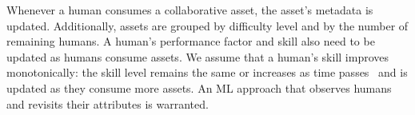 \documentclass[11pt]{article}
\begin{document}

 
 Whenever a human consumes a collaborative asset, the asset's metadata is updated. Additionally, assets are grouped by difficulty level and by the number of remaining humans. 
A human's performance factor and skill also need to be updated as humans consume assets. We assume that a human's skill improves monotonically: the skill level remains the same or increases as time passes~\cite{ML13,UMK20} and is updated as they consume more assets. An ML approach that observes humans and revisits their attributes is warranted. 






\end{document}
